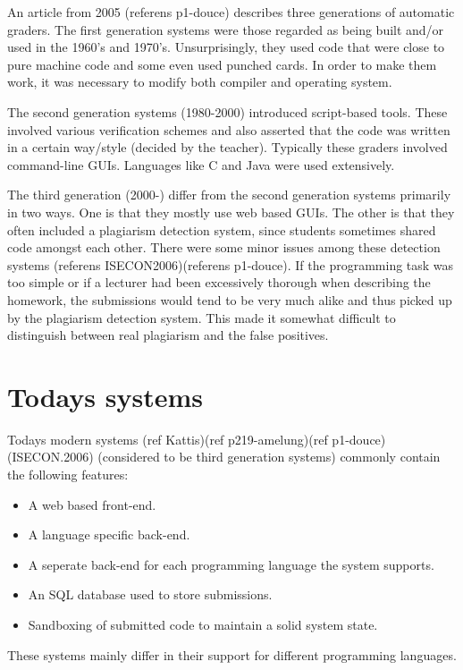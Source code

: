An article from 2005 (referens p1-douce) describes three generations of automatic graders. The first generation systems were those regarded as being built and/or used in the 1960's and 1970's. Unsurprisingly, they used code that were close to pure machine code and some even used punched cards. In order to make them work, it was necessary to modify both compiler and operating system. 

The second generation systems (1980-2000) introduced script-based tools. These involved various verification schemes and also asserted that the code was written in a certain way/style (decided by the teacher). Typically these graders involved command-line GUIs. Languages like C and Java were used extensively.

The third generation (2000-) differ from the second generation systems primarily in two ways. One is that they mostly use web based GUIs. The other is that they often included a plagiarism detection system, since students sometimes shared code amongst each other. There were some minor issues among these detection systems (referens ISECON2006)(referens p1-douce). If the programming task was too simple or if a lecturer had been excessively thorough when describing the homework, the submissions would tend to be very much alike and thus picked up by the plagiarism detection system. This made it somewhat difficult to distinguish between real plagiarism and the false positives. 


\section{Todays systems}
Todays modern systems (ref Kattis)(ref p219-amelung)(ref p1-douce)(ISECON.2006) (considered to be third generation systems) commonly contain the following features:
\begin{itemize}
	\item A web based front-end.
	\item A language specific back-end.
	\item A seperate back-end for each programming language the system supports.
	\item An SQL database used to store submissions.
	\item Sandboxing of submitted code to maintain a solid system state. 
\end{itemize}
These systems mainly differ in their support for different programming languages.
